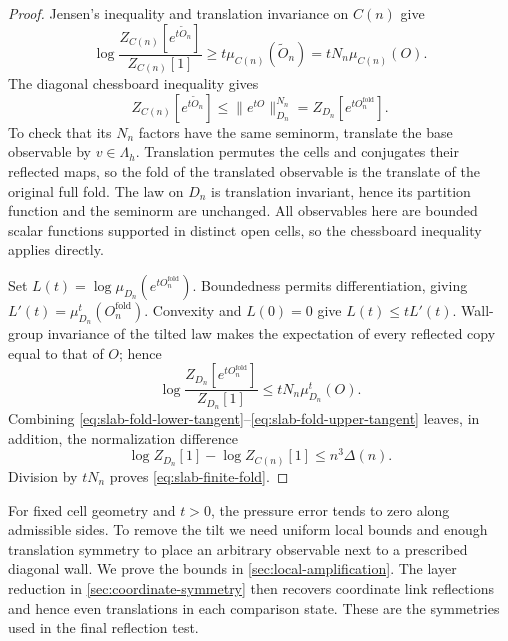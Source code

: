 \begin{proof}
Jensen's inequality and translation invariance on $C(n)$ give
\begin{equation}\label{eq:slab-fold-lower-tangent}
 \log\frac{Z_{C(n)}[e^{t\widetilde O_n}]}{Z_{C(n)}[1]}
                     \ge t\mu_{C(n)}(\widetilde O_n)
                     =tN_n\mu_{C(n)}(O).
\end{equation}
The diagonal chessboard inequality gives
\begin{equation}\label{eq:slab-fold-change}
 Z_{C(n)}[e^{t\widetilde O_n}]
               \le\|e^{tO}\|_{D_n}^{N_n}
               =Z_{D_n}[e^{tO_n^{\mathrm{fold}}}].
\end{equation}
To check that its $N_n$ factors have the same seminorm, translate
the base observable by $v\in\Lambda_h$. Translation permutes the cells
and conjugates their reflected maps, so the fold of the translated
observable is the translate of the original full fold. The law on
$D_n$ is translation invariant, hence its partition function and
the seminorm are unchanged. All observables here are bounded scalar
functions supported in distinct open cells, so the chessboard
inequality applies directly.

Set $L(t)=\log\mu_{D_n}(e^{tO_n^{\mathrm{fold}}})$. Boundedness
permits differentiation, giving
$L'(t)=\mu_{D_n}^t(O_n^{\mathrm{fold}})$. Convexity and $L(0)=0$
give $L(t)\le tL'(t)$. Wall-group invariance of the tilted law makes
the expectation of every reflected copy equal to that of $O$; hence
\begin{equation}\label{eq:slab-fold-upper-tangent}
 \log\frac{Z_{D_n}[e^{tO_n^{\mathrm{fold}}}]}{Z_{D_n}[1]}
                          \le tN_n\mu_{D_n}^t(O).
\end{equation}
Combining \eqref{eq:slab-fold-lower-tangent}--\eqref{eq:slab-fold-upper-tangent}
leaves, in addition, the normalization difference
\[
 \log Z_{D_n}[1]-\log Z_{C(n)}[1]\le n^3\Delta(n).
\]
Division by $tN_n$ proves \eqref{eq:slab-finite-fold}.
\end{proof}

For fixed cell geometry and $t>0$, the pressure error tends to
zero along admissible sides. To remove the tilt we need uniform local
bounds and enough translation symmetry to place an arbitrary observable
next to a prescribed diagonal wall. We prove the bounds in
\cref{sec:local-amplification}. The layer reduction in
\cref{sec:coordinate-symmetry} then recovers coordinate link reflections
and hence even translations in each comparison state. These are the
symmetries used in the final reflection test.


